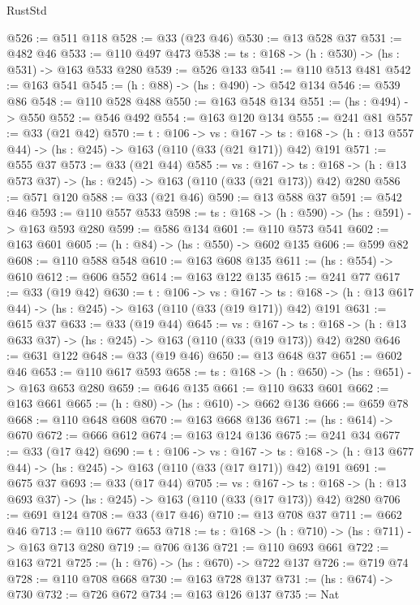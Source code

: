 \begin{lexlean}{RustStd}
\begin{coremodule}
{\begin{coremodule}
{{{{{@526 := @511 @118
@528 := @33 (@23 @46)
@530 := @13 @528 @37
@531 := @482 @46
@533 := @110 @497 @473
@538 := {ts : @168} -> (h : @530) -> (hs : @531) -> @163 @533 @280
@539 := @526 @133
@541 := @110 @513 @481
@542 := @163 @541
@545 := (h : @88) -> (hs : @490) -> @542 @134
@546 := @539 @86
@548 := @110 @528 @488
@550 := @163 @548 @134
@551 := (hs : @494) -> @550
@552 := @546 @492
@554 := @163 @120 @134
@555 := @241 @81
@557 := @33 (@21 @42)
@570 := {t : @106} ->
  {vs : @167} ->
  {ts : @168} -> (h : @13 @557 @44) -> (hs : @245) -> @163 (@110 (@33 (@21 @171)) @42) @191
@571 := @555 @37
@573 := @33 (@21 @44)
@585 := {vs : @167} ->
  {ts : @168} -> (h : @13 @573 @37) -> (hs : @245) -> @163 (@110 (@33 (@21 @173)) @42) @280
@586 := @571 @120
@588 := @33 (@21 @46)
@590 := @13 @588 @37
@591 := @542 @46
@593 := @110 @557 @533
@598 := {ts : @168} -> (h : @590) -> (hs : @591) -> @163 @593 @280
@599 := @586 @134
@601 := @110 @573 @541
@602 := @163 @601
@605 := (h : @84) -> (hs : @550) -> @602 @135
@606 := @599 @82
@608 := @110 @588 @548
@610 := @163 @608 @135
@611 := (hs : @554) -> @610
@612 := @606 @552
@614 := @163 @122 @135
@615 := @241 @77
@617 := @33 (@19 @42)
@630 := {t : @106} ->
  {vs : @167} ->
  {ts : @168} -> (h : @13 @617 @44) -> (hs : @245) -> @163 (@110 (@33 (@19 @171)) @42) @191
@631 := @615 @37
@633 := @33 (@19 @44)
@645 := {vs : @167} ->
  {ts : @168} -> (h : @13 @633 @37) -> (hs : @245) -> @163 (@110 (@33 (@19 @173)) @42) @280
@646 := @631 @122
@648 := @33 (@19 @46)
@650 := @13 @648 @37
@651 := @602 @46
@653 := @110 @617 @593
@658 := {ts : @168} -> (h : @650) -> (hs : @651) -> @163 @653 @280
@659 := @646 @135
@661 := @110 @633 @601
@662 := @163 @661
@665 := (h : @80) -> (hs : @610) -> @662 @136
@666 := @659 @78
@668 := @110 @648 @608
@670 := @163 @668 @136
@671 := (hs : @614) -> @670
@672 := @666 @612
@674 := @163 @124 @136
@675 := @241 @34
@677 := @33 (@17 @42)
@690 := {t : @106} ->
  {vs : @167} ->
  {ts : @168} -> (h : @13 @677 @44) -> (hs : @245) -> @163 (@110 (@33 (@17 @171)) @42) @191
@691 := @675 @37
@693 := @33 (@17 @44)
@705 := {vs : @167} ->
  {ts : @168} -> (h : @13 @693 @37) -> (hs : @245) -> @163 (@110 (@33 (@17 @173)) @42) @280
@706 := @691 @124
@708 := @33 (@17 @46)
@710 := @13 @708 @37
@711 := @662 @46
@713 := @110 @677 @653
@718 := {ts : @168} -> (h : @710) -> (hs : @711) -> @163 @713 @280
@719 := @706 @136
@721 := @110 @693 @661
@722 := @163 @721
@725 := (h : @76) -> (hs : @670) -> @722 @137
@726 := @719 @74
@728 := @110 @708 @668
@730 := @163 @728 @137
@731 := (hs : @674) -> @730
@732 := @726 @672
@734 := @163 @126 @137
@735 := Nat
}}}}}
\end{coremodule}}
\end{coremodule}
\end{lexlean}
